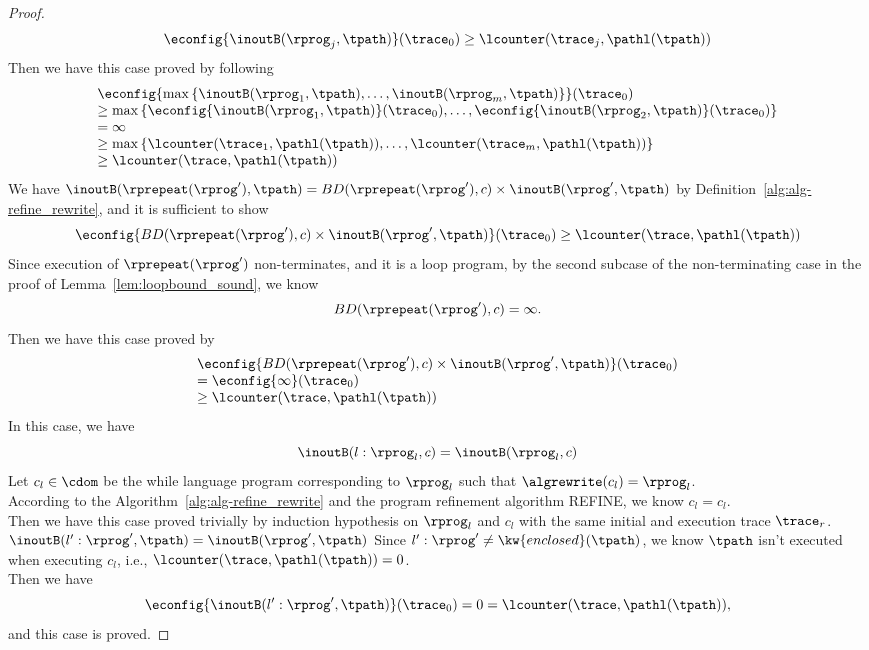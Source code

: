 \begin{proof}
\[
  \econfig{\inoutB(\rprog_j, \tpath)}(\trace_0) 
  \geq \lcounter(\trace_j, \pathl(\tpath)) 
\]
Then we have this case proved by following
\[
  \begin{array}{l}
    \econfig{\max\left\{ \inoutB(\rprog_1, \tpath), \ldots, \inoutB(\rprog_m, \tpath) \right\}}(\trace_0)
    \\
    \geq \max\left\{ \econfig{\inoutB(\rprog_1, \tpath)}(\trace_0), \ldots, \econfig{\inoutB(\rprog_2, \tpath)}(\trace_0)\right\}
    \\
    =  \infty
    \\
    \geq \max\left\{ \lcounter(\trace_1,  \pathl(\tpath)),  \ldots, \lcounter(\trace_m,  \pathl(\tpath))  \right\}
    \\
    \geq \lcounter(\trace, \pathl(\tpath))
    \end{array}
  \]
We have $\inoutB(\rprepeat(\rprog'), \tpath) = BD(\rprepeat(\rprog'), c) \times \inoutB(\rprog', \tpath)$
by Definition~\ref{alg:alg-refine_rewrite}, and
it is sufficient to show
\[
  \econfig{ BD(\rprepeat(\rprog'), c) \times \inoutB(\rprog', \tpath)} (\trace_0) \geq \lcounter(\trace, \pathl(\tpath)) 
\]
Since execution of $\rprepeat(\rprog')$ non-terminates, and it is a loop program,
by the second subcase of the non-terminating case in the proof of Lemma~\ref{lem:loopbound_sound}, we know
\[
  BD(\rprepeat(\rprog'), c) = \infty.
\]
Then we have this case proved by
\[
  \begin{array}{l}
  \econfig{BD(\rprepeat(\rprog'), c) \times \inoutB(\rprog', \tpath)}(\trace_0) 
  \\
  =
  \econfig{ \infty }(\trace_0) 
  \\
  \geq \lcounter(\trace, \pathl(\tpath)) 
  \end{array}
  \]
  In this case, we have
  \[
    \inoutB(l: \rprog_l, c) = \inoutB(\rprog_l, c)
  \]
  Let $c_l \in \cdom$ be the while language program corresponding to $\rprog_l$ such that $\algrewrite(c_l) = \rprog_l$.
  \\
  According to the Algorithm~\ref{alg:alg-refine_rewrite} and the program refinement algorithm REFINE, we know
  $c_l = c_l$.
  \\
  Then we have this case proved trivially by induction hypothesis on $\rprog_l$ and $c_l$ with the same initial and execution trace $\trace_r$.
$\inoutB(l': \rprog', \tpath) = \inoutB(\rprog', \tpath)$ 
Since $l': \rprog' \neq \kw{enclosed}(\tpath)$, we know $\tpath$ isn't executed when executing $c_l$, i.e., $\lcounter(\trace, \pathl(\tpath)) = 0$.
\\
Then we have
\[
  \econfig{\inoutB(l': \rprog', \tpath)}(\trace_0) = 0 = \lcounter(\trace, \pathl(\tpath)),
  \]
and this case is proved.
\end{proof}



